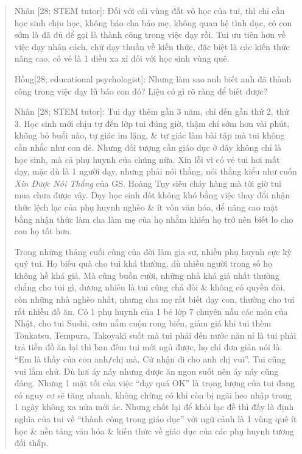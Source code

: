\documentclass[12pt,twoside]{book}
\begin{document}
\begin{quote}
	{\sf Nhân [28; STEM tutor]}: Đối với cái vùng đất vô học của tui, thì chỉ cần học sinh chịu học, không báo cha báo mẹ, không quan hệ tình dục, có con sớm là đã đủ để gọi là thành công trong việc dạy rồi. Tui ưu tiên hơn về việc dạy nhân cách, chứ dạy thuần về kiến thức, đặc biệt là các kiến thức nâng cao, có vẻ là 1 điều xa xỉ đối với học sinh vùng quê.
	
	{\sf Hồng[28; educational psychologist]}: Nhưng làm sao anh biết anh đã thành công trong việc dạy lũ báo con đó? Liệu có gì rõ ràng để biết được?
	
	{\sf Nhân [28; STEM tutor]}: Tui dạy thêm gần 3 năm, chỉ đến gần thứ 2, thứ 3. Học sinh mới chịu tự đến lớp tui đúng giờ, thậm chí sớm hơn vài phút, không bỏ buổi nào, tự giác im lặng, \& tự giác làm bài tập mà tui không cần nhắc như con đẻ. Nhưng đối tượng cần giáo dục ở đây không chỉ là học sinh, mà cả phụ huynh của chúng nữa. Xin lỗi vì có vẻ tui hơi mất dạy, mặc dù là 1 người dạy, nhưng phải nói thẳng, nói thẳng kiểu như cuốn {\it Xin Được Nói Thẳng} của GS. {\sc Hoàng Tụy} siêu cháy hàng mà tới giờ tui mua chưa được vậy. Dạy học sinh dốt không khó bằng việc thay đổi nhận thức lệch lạc của phụ huynh nghèo \& ít vốn văn hóa, để nâng cao mặt bằng nhận thức làm cha làm mẹ của họ nhằm khiến họ trở nên biết lo cho con họ tốt hơn.
	
	Trong những tháng cuối cùng của đời làm gia sư, nhiều phụ huynh cực kỳ quý tui. Họ biếu quà cho tui khá thường, dù nhiều người trong số họ không hề khá giả. Mà cũng buồn cười, những nhà khá giả nhất thường chẳng cho tui gì, đương nhiên là tui cũng chả đòi \& không có quyền đòi, còn những nhà nghèo nhất, nhưng cha mẹ rất biết dạy con, thường cho tui rất nhiều đồ ăn. Có 1 phụ huynh của 1 bé lớp 7 chuyên nấu các món của Nhật, cho tui Sushi, cơm nắm cuộn rong biển, giảm giá khi tui thèm Tonkatsu, Tempura, Takoyaki suốt mà tui phải đến nước năn nỉ là tui phải trả tiền đồ ăn lại thì ban đêm tui mới ngủ được, họ chỉ đơn giản nói là: ``Em là thầy của con anh{\tt/}chị mà. Cứ nhận đi cho anh chị vui''. Tui cũng vui lắm chứ. Dù hơi áy náy nhưng được ăn ngon suốt nên áy náy cũng đáng. Nhưng 1 mặt tối của việc ``dạy quá OK'' là trọng lượng của tui đang có nguy cơ sẽ tăng nhanh, không chừng có khi còn bị ngãi heo nhập trong 1 ngày không xa nữa mới ác. Nhưng chốt lại để khỏi lạc đề thì đấy là định nghĩa của tui về ``thành công trong giáo dục'' với ngữ cảnh là 1 vùng quê ít học \& nền tảng văn hóa \& kiến thức về giáo dục của các phụ huynh tương đối thấp.
	

\end{quote}
\end{document}
